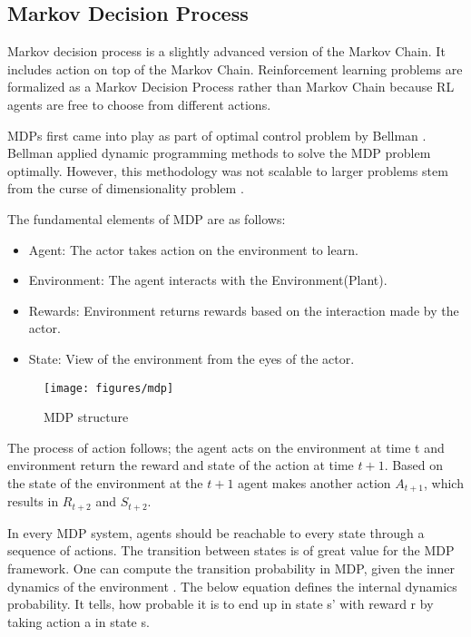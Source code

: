 \subsection{Markov Decision Process}\label{section:markov}

Markov decision process is a slightly advanced version of the Markov Chain. It includes action on top of the Markov Chain. Reinforcement learning problems are formalized as a Markov Decision Process rather than Markov Chain because RL agents are free to choose from different actions.

MDPs first came into play as part of optimal control problem by Bellman \cite{Bellman1958}. Bellman applied dynamic programming methods to solve the MDP problem optimally. However, this methodology was not scalable to larger problems stem from the curse of dimensionality problem \cite{Sutton}.

The fundamental elements of MDP are as follows:
\begin{itemize}
    \item Agent:  The actor takes action on the environment to learn.
    \item Environment: The agent interacts with the Environment(Plant).
    \item Rewards: Environment returns rewards based on the interaction made by the actor.
    \item State: View of the environment from the eyes of the actor. 
\end{itemize}

\begin{figure}[htbp]
    \centering
    \texttt{[image: figures/mdp]}
    \caption{MDP structure}
    \label{fig: mdp}
\end{figure}

The process of action follows; the agent acts on the environment at time t and environment return the reward and state of the action at time \(t+1\). Based on the state of the environment at the \(t+1\) agent makes another action \(A_{t+1}\), which results in \(R_{t+2}\) and \(S_{t+2}\).

In every MDP system, agents should be reachable to every state through a sequence of actions. The transition between states is of great value for the MDP framework.
One can compute the transition probability in MDP, given the inner dynamics of the environment \cite{Sutton2018}. The below equation defines the internal dynamics probability. It tells, how probable it is to end up in state s’ with reward r by taking action a in state s. 

